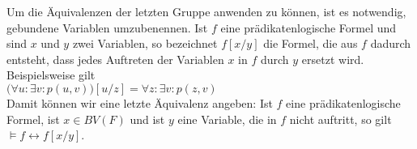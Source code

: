 Um die \"{A}quivalenzen der letzten Gruppe anwenden zu k\"{o}nnen, ist es notwendig,
gebundene Variablen umzubenennen. Ist $f$ eine pr\"{a}dikatenlogische Formel und sind $x$ und
$y$ zwei Variablen, so bezeichnet $f[x/y]$ die Formel, die aus $f$ dadurch entsteht, dass
jedes Auftreten der Variablen $x$ in $f$ durch $y$ ersetzt wird.  Beispielsweise gilt \\[0.2cm]
\hspace*{1.3cm} $\bigl(\forall u : \exists v : p(u,v)\bigr)[u/z] = \forall z : \exists v : p(z,v)$
\\[0.2cm]
Damit k\"{o}nnen wir eine letzte \"{A}quivalenz angeben: Ist $f$ eine pr\"{a}dikatenlogische Formel,
ist $x \in BV(F)$ und ist $y$ eine Variable, die in $f$ nicht auftritt, so gilt \\[0.2cm]
\hspace*{1.3cm} $\models f \leftrightarrow f[x/y]$.
\vspace{0.3cm}

